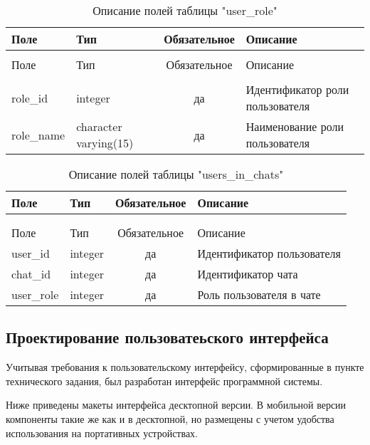 \begin{xltabular}{\textwidth}{|l|l|c|X|}
	\caption{Описание полей таблицы "user\_role"\label{user_role:table}} \hline
	Поле & Тип & Обязательное & Описание \\ \hline
	 &  &  & \\ \hline
	\endfirsthead
	 \hline
	Поле & Тип & Обязательное & Описание \\ \hline
	 &  &  & \\ \hline
	\endhead
	role\_id & integer & да & Идентификатор роли пользователя \\ \hline
	role\_name & character varying(15) & да & Наименование роли пользователя \\ \hline
\end{xltabular}

\begin{xltabular}{\textwidth}{|l|l|c|X|}
	\caption{Описание полей таблицы "users\_in\_chats"\label{users_in_chats:table}} \hline
	Поле & Тип & Обязательное & Описание \\ \hline
	 &  &  & \\ \hline
	\endfirsthead
	  &  &  & \\ \hline
	\endhead
	Поле & Тип & Обязательное & Описание \\ \hline
	\endhead
	user\_id & integer & да & Идентификатор пользователя \\ \hline
	chat\_id & integer & да & Идентификатор чата \\ \hline
	user\_role & integer & да & Роль пользователя в чате \\ \hline
\end{xltabular}

\subsection{Проектирование пользоватеьского интерфейса}

Учитывая требования к пользовательскому интерфейсу, сформированные в пункте технического задания, был разработан интерфейс программной системы. 

Ниже приведены макеты интерфейса десктопной версии. В мобильной версии компоненты такие же как и в десктопной, но размещены с учетом удобства использования на портативных устройствах.

